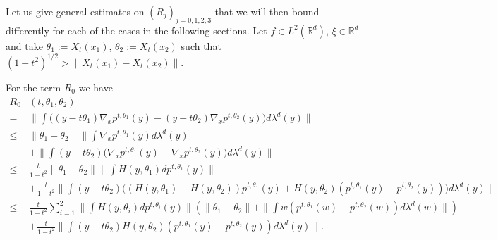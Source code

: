 \documentclass{article}
\begin{document}
Let us give general estimates on $(R_j)_{j=0,1,2,3}$ that we will then bound differently for each of the cases in the following sections. Let $f\in L^2(\mathbb{R}^d)$, $\xi\in \mathbb{R}^d$ and take $\theta_1:= X_t(x_1)$, $\theta_2:=X_t(x_2)$ such that $(1-t^2)^{1/2}> \| X_t(x_1)- X_t(x_2)\|$.

For the term $R_0$ we have 
\begin{align}\label{align:roboundtgrand}  R_0&(t,\theta_1,\theta_2)\nonumber\\ =& \|\int\Big((y-t\theta_1)\nabla_x p^{t,\theta_1}(y)-(y-t\theta_2)\nabla_x p^{t,\theta_2}(y)\Big)d\lambda^d(y)\|\nonumber\\
    \leq & \|\theta_1-\theta_2\|\|\int \nabla_x p^{t,\theta_1}(y)d\lambda^d(y)\|\nonumber\\
    & + \|\int(y-t\theta_2)\Big(\nabla_x p^{t,\theta_1}(y)-\nabla_x p^{t,\theta_2}(y)\Big)d\lambda^d(y)\|\nonumber\\
    \leq & \frac{t}{1-t^2}\|\theta_1-\theta_2\|\|\int H(y,\theta_1) dp^{t,\theta_1}(y)\|\nonumber\\
    & + \frac{t}{1-t^2}\|\int(y-t\theta_2)\Big((H(y,\theta_1)-H(y,\theta_2))p^{t,\theta_1}(y)+ H(y,\theta_2)(p^{t,\theta_1}(y)-p^{t,\theta_2}(y))\Big)d\lambda^d(y)\|\nonumber\\
    \leq & \frac{t}{1-t^2}\sum_{i=1}^2\|\int H(y,\theta_i) dp^{t,\theta_i}(y)\|\left(\|\theta_1-\theta_2\|+\|\int w (p^{t,\theta_1}(w)-p^{t,\theta_2}(w))d\lambda^d(w)\|\right)\nonumber\\
    & + \frac{t}{1-t^2}\|\int (y-t\theta_2)H(y,\theta_2)(p^{t,\theta_1}(y)-p^{t,\theta_2}(y))d\lambda^d(y)\|.
\end{align}
\end{document}
